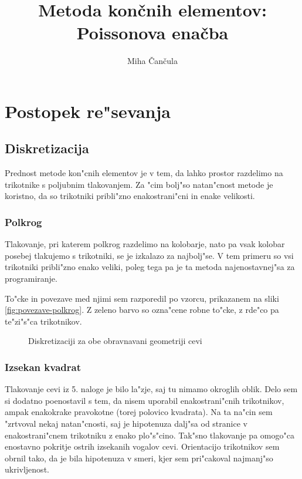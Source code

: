 \documentclass[a4paper,10pt]{article}
\title{Metoda kon\v cnih elementov: \\ Poissonova ena\v cba}
\author{Miha \v Can\v cula}
\begin{document}
\maketitle

\section{Postopek re"sevanja}

\subsection{Diskretizacija}

Prednost metode kon"cnih elementov je v tem, da lahko prostor razdelimo na trikotnike s poljubnim tlakovanjem. Za "cim bolj"so natan"cnost metode je koristno, da so trikotniki pribli"zno enakostrani"cni in enake velikosti. 

\subsubsection{Polkrog}

Tlakovanje, pri katerem polkrog razdelimo na kolobarje, nato pa vsak kolobar posebej tlakujemo s trikotniki, se je izkalazo za najbolj"se. V tem primeru so vsi trikotniki pribli"zno enako veliki, poleg tega pa je ta metoda najenostavnej"sa za programiranje. 

To"cke in povezave med njimi sem razporedil po vzorcu, prikazanem na sliki \ref{fig:povezave-polkrog}. Z zeleno barvo so ozna"cene robne to"cke, z rde"co pa te"zi"s"ca trikotnikov. 

\begin{figure}[H]
\caption{Diskretizaciji za obe obravnavani geometriji cevi}
\label{fig:povezave}
\end{figure}

\subsubsection{Izsekan kvadrat}

Tlakovanje cevi iz 5. naloge je bilo la"zje, saj tu nimamo okroglih oblik. Delo sem si dodatno poenostavil s tem, da nisem uporabil enakostrani"cnih trikotnikov, ampak enakokrake pravokotne (torej polovico kvadrata). Na ta na"cin sem "zrtvoval nekaj natan"cnosti, saj je hipotenuza dalj"sa od stranice v enakostrani"cnem trikotniku z enako plo"s"cino. Tak"sno tlakovanje pa omogo"ca enostavno pokritje ostrih izsekanih vogalov cevi. Orientacijo trikotnikov sem obrnil tako, da je bila hipotenuza v smeri, kjer sem pri"cakoval najmanj"so ukrivljenost. 
\end{document}

